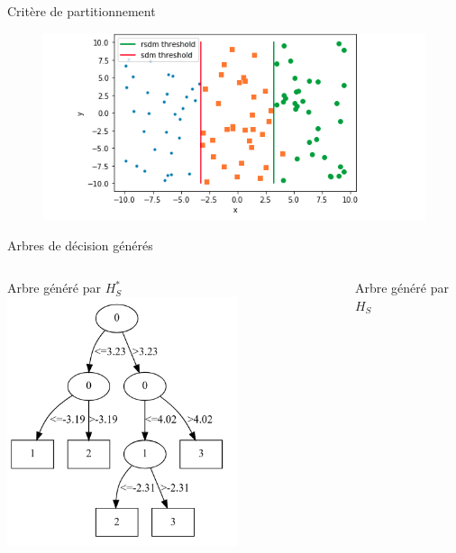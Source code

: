 \documentclass[usenames,dvipsnames]{beamer}
\begin{document}
\begin{frame}{Critère de partitionnement}
    \begin{figure}
	    \includegraphics[width=.7\textwidth]{split.png}
    \end{figure}
\end{frame}

\begin{frame}{Arbres de décision générés}
    \begin{columns}
        \begin{column}{0.5\textwidth}
            \centering
            Arbre généré par $H^*_S$\\
            \includegraphics[width=0.7\textwidth]{rsdm-tree-artificial.png}
            \vspace*{2.5cm}
        \end{column}
        \begin{column}{0.5\textwidth}
            \centering
            Arbre généré par $H_S$

\end{column}
\end{columns}
\end{frame}
\end{document}
